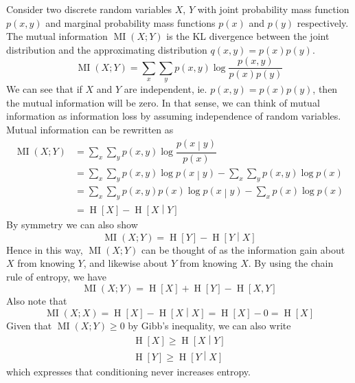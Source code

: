 \documentclass[11pt]{report} %
\begin{document}
Consider two discrete random variables $X$, $Y$ with joint probability mass function $p\left(x, y\right)$ and marginal probability mass functions $p\left(x\right)$ and $p\left(y\right)$ respectively. The mutual information $\operatorname{MI}\left(X;Y\right)$ is the KL divergence between the joint distribution and the approximating distribution $q\left(x, y\right) = p\left(x\right)p\left(y\right)$.
\begin{equation}
\operatorname{MI}\left(X;Y\right) = \sum_{x}\sum_{y}p\left(x, y\right)\log\dfrac{p\left(x, y\right)}{p\left(x\right)p\left(y\right)}
\end{equation}
We can see that if $X$ and $Y$ are independent, ie. $p\left(x, y\right) = p\left(x\right)p\left(y\right)$, then the mutual information will be zero. In that sense, we can think of mutual information as information loss by assuming independence of random variables. Mutual information can be rewritten as
\begin{align}
\operatorname{MI}\left(X;Y\right) &= \sum_{x}\sum_{y}p\left(x, y\right)\log\dfrac{p\left(x\middle|y\right)}{p\left(x\right)} \\
&= \sum_{x}\sum_{y}p\left(x, y\right)\log p\left(x\middle|y\right) - \sum_{x}\sum_{y}p\left(x, y\right)\log p\left(x\right) \\
&= \sum_{x}\sum_{y}p\left(x, y\right)p\left(x\right)\log p\left(x\middle|y\right) - \sum_{x}p\left(x\right)\log p\left(x\right) \\
&= \operatorname{H}\left[X\right] - \operatorname{H}\left[X\middle|Y\right]
\end{align}
By symmetry we can also show
\begin{equation}
\operatorname{MI}\left(X;Y\right) = \operatorname{H}\left[Y\right] - \operatorname{H}\left[Y\middle|X\right]
\end{equation}
Hence in this way, $\operatorname{MI}\left(X;Y\right)$ can be thought of as the information gain about $X$ from knowing $Y$, and likewise about $Y$ from knowing $X$. By using the chain rule of entropy, we have
\begin{equation}
\operatorname{MI}\left(X;Y\right) = \operatorname{H}\left[X\right] + \operatorname{H}\left[Y\right] - \operatorname{H}\left[X, Y\right]
\end{equation}
Also note that
\begin{equation}
\operatorname{MI}\left(X;X\right) = \operatorname{H}\left[X\right] - \operatorname{H}\left[X\middle|X\right] = \operatorname{H}\left[X\right] - 0 =  \operatorname{H}\left[X\right]
\end{equation}
Given that $\operatorname{MI}\left(X;Y\right) \geq 0$ by Gibb's inequality, we can also write
\begin{gather}
\operatorname{H}\left[X\right] \geq \operatorname{H}\left[X\middle|Y\right] \\
\operatorname{H}\left[Y\right] \geq \operatorname{H}\left[Y\middle|X\right]
\end{gather}
which expresses that conditioning never increases entropy.
\end{document}

